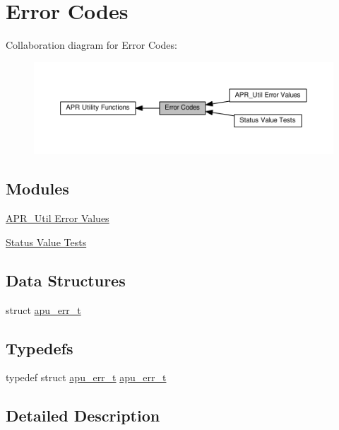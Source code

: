 \hypertarget{group__apu__errno}{}\section{Error Codes}
\label{group__apu__errno}
Collaboration diagram for Error Codes\+:
\nopagebreak
\begin{figure}[H]
\begin{center}
\leavevmode
\includegraphics[width=350pt]{group__apu__errno}
\end{center}
\end{figure}
\subsection*{Modules}
\begin{DoxyCompactItemize}
\item 
\hyperlink{group__APR__Util__Error}{A\+P\+R\+\_\+\+Util Error Values}
\item 
\hyperlink{group__APU__STATUS__IS}{Status Value Tests}
\end{DoxyCompactItemize}
\subsection*{Data Structures}
\begin{DoxyCompactItemize}
\item 
struct \hyperlink{structapu__err__t}{apu\+\_\+err\+\_\+t}
\end{DoxyCompactItemize}
\subsection*{Typedefs}
\begin{DoxyCompactItemize}
\item 
typedef struct \hyperlink{structapu__err__t}{apu\+\_\+err\+\_\+t} \hyperlink{group__apu__errno_ga5871eecd18a15baa660bb5769e32b097}{apu\+\_\+err\+\_\+t}
\end{DoxyCompactItemize}


\subsection{Detailed Description}


